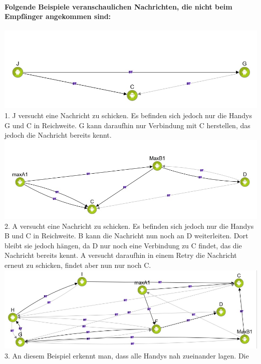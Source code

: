 \paragraph*{Folgende Beispiele veranschaulichen Nachrichten, die nicht beim
Empfänger angekommen sind:}
\includegraphics[width=1.0\textwidth]{belege/grosstests/Bilder/Miserfolg6.jpg}\\ 1. J versucht
eine Nachricht zu schicken. Es befinden sich jedoch nur die Handys G und
C in Reichweite. G kann daraufhin nur Verbindung mit C herstellen, das
jedoch die Nachricht bereits kennt.\\
\includegraphics[width=1.0\textwidth]{belege/grosstests/Bilder/Miserfolg5.jpg}\\ 2. A versucht
eine Nachricht zu schicken. Es befinden sich jedoch nur die Handys B und
C in Reichweite. B kann die Nachricht nun noch an D weiterleiten. Dort
bleibt sie jedoch hängen, da D nur noch eine Verbindung zu C findet, das
die Nachricht bereits kennt. A versucht daraufhin in einem Retry die
Nachricht erneut zu schicken, findet aber nun nur noch C.\\
\includegraphics[width=1.0\textwidth]{belege/grosstests/Bilder/Miserfolg4.jpg}\\ 3. An diesem
Beispiel erkennt man, dass alle Handys nah zueinander lagen. Die

